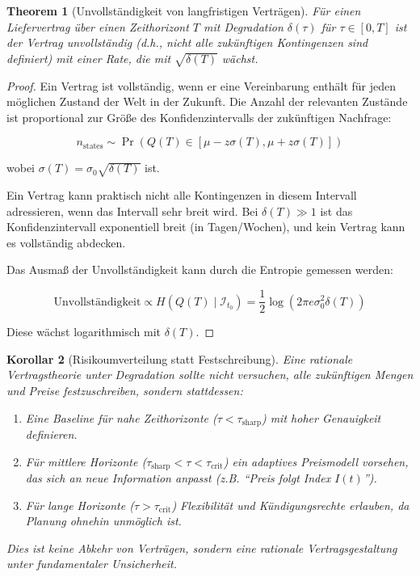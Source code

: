 \documentclass[12pt, a4paper, titlepage]{report}
\newtheorem{theorem}{Theorem}[section]
\newtheorem{corollary}[theorem]{Korollar}
\theoremstyle{definition}
\theoremstyle{remark}
\begin{document}
\begin{theorem}[Unvollständigkeit von langfristigen Verträgen]
\label{thm:contract_incompleteness}
Für einen Liefervertrag über einen Zeithorizont $T$ mit Degradation $\delta(\tau)$ für $\tau \in [0, T]$ ist der Vertrag unvollständig (d.h., nicht alle zukünftigen Kontingenzen sind definiert) mit einer Rate, die mit $\sqrt{\delta(T)}$ wächst.
\end{theorem}

\begin{proof}
Ein Vertrag ist vollständig, wenn er eine Vereinbarung enthält für jeden möglichen Zustand der Welt in der Zukunft. Die Anzahl der relevanten Zustände ist proportional zur Größe des Konfidenzintervalls der zukünftigen Nachfrage:

\begin{equation}
n_{\text{states}} \sim \Pr(Q(T) \in [\mu - z\sigma(T), \mu + z\sigma(T)])
\end{equation}

wobei $\sigma(T) = \sigma_0 \sqrt{\delta(T)}$ ist.

Ein Vertrag kann praktisch nicht alle Kontingenzen in diesem Intervall adressieren, wenn das Intervall sehr breit wird. Bei $\delta(T) \gg 1$ ist das Konfidenzintervall exponentiell breit (in Tagen/Wochen), und kein Vertrag kann es vollständig abdecken.

Das Ausmaß der Unvollständigkeit kann durch die Entropie gemessen werden:

\begin{equation}
\text{Unvollständigkeit} \propto H(Q(T) \mid \mathcal{I}_{t_0}) = \frac{1}{2}\log(2\pi e \sigma_0^2 \delta(T))
\end{equation}

Diese wächst logarithmisch mit $\delta(T)$.
\end{proof}

\begin{corollary}[Risikoumverteilung statt Festschreibung]
Eine rationale Vertragstheorie unter Degradation sollte nicht versuchen, alle zukünftigen Mengen und Preise festzuschreiben, sondern stattdessen:

\begin{enumerate}
  \item Eine \emph{Baseline} für nahe Zeithorizonte ($\tau < \tau_{\text{sharp}}$) mit hoher Genauigkeit definieren.
  
  \item Für mittlere Horizonte ($\tau_{\text{sharp}} < \tau < \tau_{\text{crit}}$) ein \emph{adaptives Preismodell} vorsehen, das sich an neue Information anpasst (z.B. ``Preis folgt Index $I(t)$'').
  
  \item Für lange Horizonte ($\tau > \tau_{\text{crit}}$) Flexibilität und Kündigungsrechte erlauben, da Planung ohnehin unmöglich ist.
\end{enumerate}

Dies ist keine Abkehr von Verträgen, sondern eine \emph{rationale Vertragsgestaltung unter fundamentaler Unsicherheit}.
\end{corollary}
\end{document}
